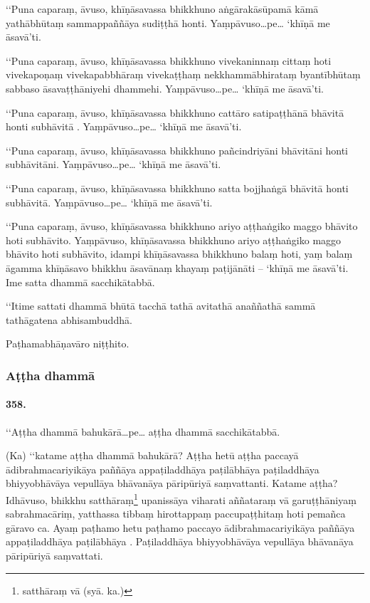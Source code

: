 ‘‘Puna caparaṃ, āvuso, khīṇāsavassa bhikkhuno aṅgārakāsūpamā kāmā yathābhūtaṃ sammappaññāya sudiṭṭhā honti. Yaṃpāvuso…pe… ‘khīṇā me āsavā’ti.

‘‘Puna caparaṃ, āvuso, khīṇāsavassa bhikkhuno vivekaninnaṃ cittaṃ hoti vivekapoṇaṃ vivekapabbhāraṃ vivekaṭṭhaṃ nekkhammābhirataṃ byantībhūtaṃ sabbaso āsavaṭṭhāniyehi dhammehi. Yaṃpāvuso…pe… ‘khīṇā me āsavā’ti.

‘‘Puna caparaṃ, āvuso, khīṇāsavassa bhikkhuno cattāro satipaṭṭhānā bhāvitā honti subhāvitā . Yaṃpāvuso…pe… ‘khīṇā me āsavā’ti.

‘‘Puna caparaṃ, āvuso, khīṇāsavassa bhikkhuno pañcindriyāni bhāvitāni honti subhāvitāni. Yaṃpāvuso…pe… ‘khīṇā me āsavā’ti.

‘‘Puna caparaṃ, āvuso, khīṇāsavassa bhikkhuno satta bojjhaṅgā bhāvitā honti subhāvitā. Yaṃpāvuso…pe… ‘khīṇā me āsavā’ti.

‘‘Puna caparaṃ, āvuso, khīṇāsavassa bhikkhuno ariyo aṭṭhaṅgiko maggo bhāvito hoti subhāvito. Yaṃpāvuso, khīṇāsavassa bhikkhuno ariyo aṭṭhaṅgiko maggo bhāvito hoti subhāvito, idampi khīṇāsavassa bhikkhuno balaṃ hoti, yaṃ balaṃ āgamma khīṇāsavo bhikkhu āsavānaṃ khayaṃ paṭijānāti – ‘khīṇā me āsavā’ti. Ime satta dhammā sacchikātabbā.

‘‘Itime sattati dhammā bhūtā tacchā tathā avitathā anaññathā sammā tathāgatena abhisambuddhā.

Paṭhamabhāṇavāro niṭṭhito.

\subsubsection{Aṭṭha dhammā}

\paragraph{358.} ‘‘Aṭṭha dhammā bahukārā…pe… aṭṭha dhammā sacchikātabbā.

(Ka) ‘‘katame aṭṭha dhammā bahukārā? Aṭṭha hetū aṭṭha paccayā ādibrahmacariyikāya paññāya appaṭiladdhāya paṭilābhāya paṭiladdhāya bhiyyobhāvāya vepullāya bhāvanāya pāripūriyā saṃvattanti. Katame aṭṭha? Idhāvuso, bhikkhu satthāraṃ\footnote{satthāraṃ vā (syā. ka.)} upanissāya viharati aññataraṃ vā garuṭṭhāniyaṃ sabrahmacāriṃ, yatthassa tibbaṃ hirottappaṃ paccupaṭṭhitaṃ hoti pemañca gāravo ca. Ayaṃ paṭhamo hetu paṭhamo paccayo ādibrahmacariyikāya paññāya appaṭiladdhāya paṭilābhāya . Paṭiladdhāya bhiyyobhāvāya vepullāya bhāvanāya pāripūriyā saṃvattati.

